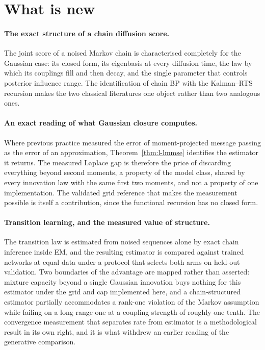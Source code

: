 \section{What is new}

\paragraph{The exact structure of a chain diffusion score.} The joint score of a
noised Markov chain is characterised completely for the Gaussian case: its
closed form, its eigenbasis at every diffusion time, the law by which its
couplings fill and then decay, and the single parameter that controls posterior
influence range. The identification of chain BP with the Kalman--RTS recursion
makes the two classical literatures one object rather than two analogous ones.

\paragraph{An exact reading of what Gaussian closure computes.} Where previous
practice measured the error of moment-projected message passing as the error of
an approximation, Theorem~\ref{thm:l-lmmse} identifies the estimator it returns.
The measured Laplace gap is therefore the price of discarding everything beyond
second moments, a property of the model class, shared by every innovation law
with the same first two moments, and not a property of one implementation.
The validated grid reference that makes the measurement possible is itself a
contribution, since the functional recursion has no closed form.

\paragraph{Transition learning, and the measured value of structure.} The
transition law is estimated from noised sequences alone by exact chain inference
inside EM, and the resulting estimator is compared against trained networks at
equal data under a protocol that selects both arms on held-out validation. Two
boundaries of the advantage are mapped rather than asserted: mixture capacity
beyond a single Gaussian innovation buys nothing for this estimator under the
grid and cap implemented here, and a chain-structured estimator partially
accommodates a rank-one violation of the Markov assumption while failing on a
long-range one at a coupling strength of roughly one tenth. The convergence
measurement that separates rate from estimator is a methodological result in its
own right, and it is what withdrew an earlier reading of the generative
comparison.

